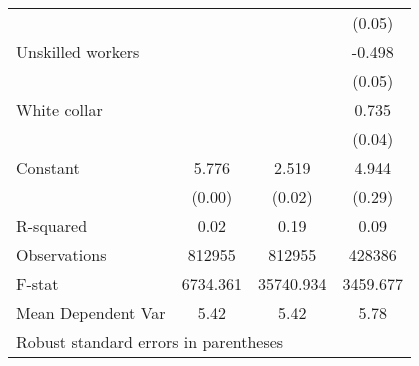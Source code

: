 {\begin{tabular}{l*{3}{c}}
                    &                     &                     &      (0.05)         \\
Unskilled workers   &                     &                     &      -0.498\sym{***}\\
                    &                     &                     &      (0.05)         \\
White collar        &                     &                     &       0.735\sym{***}\\
                    &                     &                     &      (0.04)         \\
Constant            &       5.776\sym{***}&       2.519\sym{***}&       4.944\sym{***}\\
                    &      (0.00)         &      (0.02)         &      (0.29)         \\
\hline
R-squared           &        0.02         &        0.19         &        0.09         \\
Observations        &      812955         &      812955         &      428386         \\
F-stat              &    6734.361         &   35740.934         &    3459.677         \\
Mean Dependent Var  &        5.42         &        5.42         &        5.78         \\
\hline\hline
\multicolumn{4}{l}{\footnotesize Robust standard errors in parentheses}\\
\end{tabular}
}
